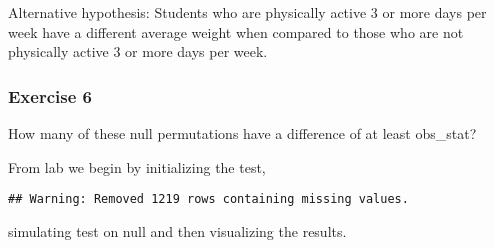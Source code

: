 \documentclass[
]{article}
\newenvironment{Shaded}{\begin{snugshade}}{\end{snugshade}}
\newcommand{\DataTypeTok}[1]{\textcolor[rgb]{0.13,0.29,0.53}{#1}}
\newcommand{\DecValTok}[1]{\textcolor[rgb]{0.00,0.00,0.81}{#1}}
\newcommand{\KeywordTok}[1]{\textcolor[rgb]{0.13,0.29,0.53}{\textbf{#1}}}
\newcommand{\NormalTok}[1]{#1}
\newcommand{\OperatorTok}[1]{\textcolor[rgb]{0.81,0.36,0.00}{\textbf{#1}}}
\newcommand{\StringTok}[1]{\textcolor[rgb]{0.31,0.60,0.02}{#1}}
\begin{document}
Alternative hypothesis: Students who are physically active 3 or more
days per week have a different average weight when compared to those who
are not physically active 3 or more days per week.

\hypertarget{exercise-6}{%
\subsubsection{Exercise 6}\label{exercise-6}}

How many of these null permutations have a difference of at least
obs\_stat?

From lab we begin by initializing the test,

\begin{Shaded}
\end{Shaded}

\begin{verbatim}
## Warning: Removed 1219 rows containing missing values.
\end{verbatim}

simulating test on null and then visualizing the results.

\begin{Shaded}
\end{Shaded}
\end{document}
